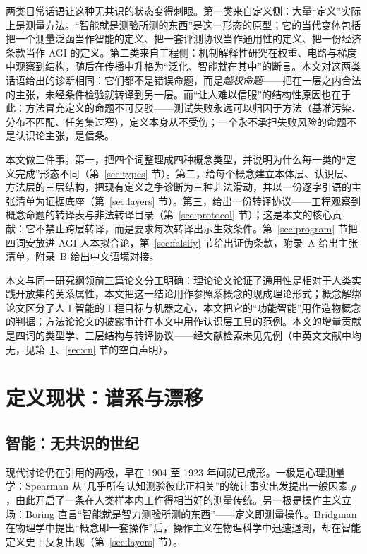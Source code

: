 \documentclass[10pt,fontset=fandol]{ctexart}
\begin{document}
两类日常话语让这种无共识的状态变得刺眼。第一类来自定义侧：大量“定义”实际上是测量方法。“智能就是测验所测的东西”\cite{boring1923intelligence}是这一形态的原型；它的当代变体包括把一个测量泛函当作智能的定义\cite{legg2007universal}、把一套评测协议当作通用性的定义\cite{morris2023levels,chollet2019measure}、把一份经济条款当作 AGI 的定义\cite{openai2018charter}。第二类来自工程侧：机制解释性研究在权重、电路与梯度中观察到结构，随后在传播中升格为“泛化、智能就在其中”的断言。本文对这两类话语给出的诊断相同：它们都不是错误命题，而是\emph{越权命题}——把在一层之内合法的主张，未经条件检验就转译到另一层。而“让人难以信服”的结构性原因也在于此：方法冒充定义的命题不可反驳——测试失败永远可以归因于方法（基准污染、分布不匹配、任务集过窄），定义本身从不受伤；一个永不承担失败风险的命题不是认识论主张，是信条。

本文做三件事。第一，把四个词整理成四种概念类型，并说明为什么每一类的“定义完成”形态不同（第~\ref{sec:types} 节）。第二，给每个概念建立本体层、认识层、方法层的三层结构，把现有定义之争诊断为三种非法滑动，并以一份逐字引语的主张清单为证据底座（第~\ref{sec:layers} 节）。第三，给出一份转译协议——工程观察到概念命题的转译表与非法转译目录（第~\ref{sec:protocol} 节）；这是本文的核心贡献：它不禁止跨层转译，而是要求每次转译出示生效条件。第~\ref{sec:program} 节把四词安放进 AGI 人本拟合论，第~\ref{sec:falsify} 节给出证伪条款，附录~A 给出主张清单，附录~B 给出中文语境对接。

本文与同一研究纲领前三篇论文分工明确：理论论文论证了通用性是相对于人类实践开放集的关系属性\cite{yu2026theory}，本文把这一结论用作参照系概念的现成理论形式；概念解绑论文区分了人工智能的工程目标与机器之心\cite{yu2026twogoals}，本文把它的“功能智能”用作造物概念的判据；方法论论文的披露审计\cite{yu2026methodology}在本文中用作认识层工具的范例。本文的增量贡献是四词的类型学、三层结构与转译协议——经文献检索未见先例（中英文文献中均无，见第~\ref{sec:survey}、\ref{sec:cn} 节的空白声明）。

\section{定义现状：谱系与漂移}\label{sec:survey}

\subsection{智能：无共识的世纪}

现代讨论仍在引用的两极，早在 1904 至 1923 年间就已成形。一极是心理测量学：Spearman 从“几乎所有认知测验彼此正相关”的统计事实出发提出一般因素 $g$\cite{spearman1904general}，由此开启了一条在人类样本内工作得相当好的测量传统。另一极是操作主义立场：Boring 直言“智能就是智力测验所测的东西”\cite{boring1923intelligence}——定义即测量操作。Bridgman 在物理学中提出“概念即一套操作”\cite{bridgman1927logic}后，操作主义在物理科学中迅速退潮，却在智能定义史上反复出现（第~\ref{sec:layers} 节）。
\end{document}
